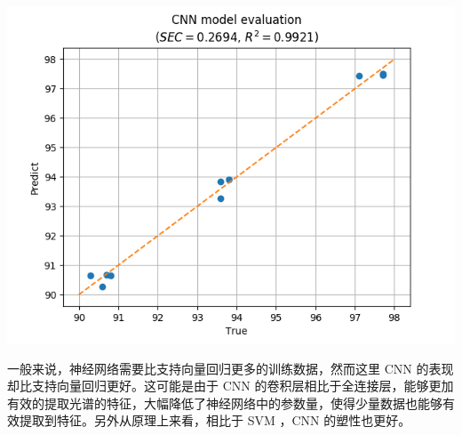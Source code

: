 \documentclass[11pt]{beamer}
\begin{document}
	\begin{frame}
		\centering
		\includegraphics[width=\linewidth]{../img/cnn_result}
	\end{frame}
	\begin{frame}
			一般来说，神经网络需要比支持向量回归更多的训练数据，然而这里 CNN 的表现却比支持向量回归更好。这可能是由于 CNN 的卷积层相比于全连接层，能够更加有效的提取光谱的特征，大幅降低了神经网络中的参数量，使得少量数据也能够有效提取到特征。另外从原理上来看，相比于 SVM ，CNN 的塑性也更好。
	\end{frame}
\end{document}
